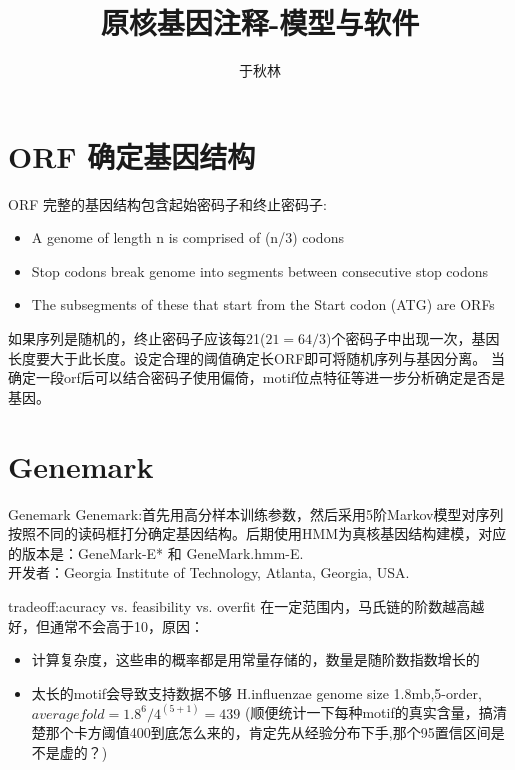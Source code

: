 \documentclass[handout]{beamer}
\begin{document}
{
\begin{frame}
    \title{原核基因注释-模型与软件}
    \author{于秋林}
    \maketitle
\end{frame}
}
\newpage
{
\small{                         
\tableofcontents
}
}
\section{ORF 确定基因结构}
\begin{frame}[label=ORF]{ORF}
完整的基因结构包含起始密码子和终止密码子:
\begin{itemize}
        \item A genome of length n is comprised of (n/3) codons
        \item Stop codons break genome into segments between consecutive stop codons
        \item The subsegments of these that start from the Start codon (ATG) are ORFs
\end{itemize}
如果序列是随机的，终止密码子应该每21($21=64/3$)个密码子中出现一次，基因长度要大于此长度。设定合理的阈值确定长ORF即可将随机序列与基因分离。
当确定一段orf后可以结合密码子使用偏倚，motif位点特征等进一步分析确定是否是基因。
\end{frame}

\section{Genemark}
\begin{frame}{Genemark}
Genemark:首先用高分样本训练参数，然后采用5阶Markov模型对序列按照不同的读码框打分确定基因结构。后期使用HMM为真核基因结构建模，对应的版本是：GeneMark-E* 和 GeneMark.hmm-E.\\
开发者：\alert{Georgia Institute of Technology, Atlanta, Georgia, USA.}
\end{frame}

\begin{frame}{tradeoff:acuracy vs. feasibility vs. overfit}
在一定范围内，马氏链的阶数越高越好，但通常不会高于10，原因：
\begin{itemize}[<+->]
        \item 计算复杂度，这些串的概率都是用常量存储的，数量是随阶数指数增长的 
        \item 太长的motif会导致支持数据不够 H.influenzae genome size 1.8mb,5-order,$average fold=1.8^6/4^(5+1)=439$ (顺便统计一下每种motif的真实含量，搞清楚那个卡方阈值400到底怎么来的，肯定先从经验分布下手,那个95置信区间是不是虚的？)
\end{itemize}   
\end{frame}
\end{document}
